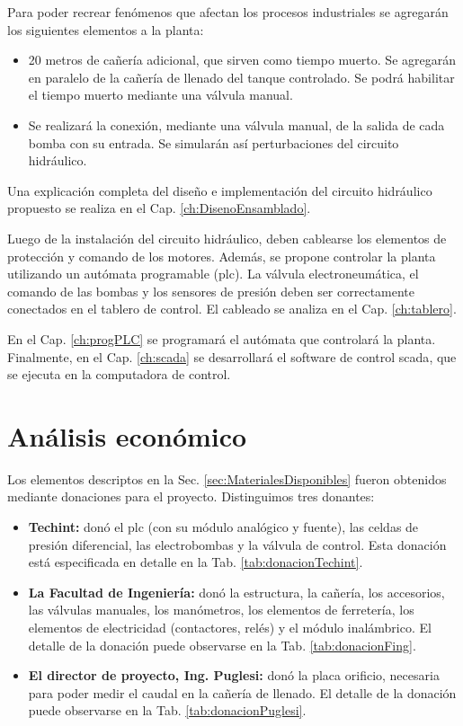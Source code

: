 Para poder recrear fenómenos que afectan los procesos industriales se agregarán
los siguientes elementos a la planta:
\begin{itemize}
\item 20 metros de cañería adicional, que sirven como tiempo
muerto.
Se agregarán en paralelo de la cañería de llenado del tanque controlado.
Se podrá habilitar el tiempo muerto mediante una válvula manual.
\item Se realizará la conexión, mediante una válvula manual, de la salida de
cada bomba con su entrada. Se simularán así perturbaciones
del circuito hidráulico.
\end{itemize}

Una explicación completa del diseño e implementación del circuito hidráulico
propuesto se realiza en el Cap. \ref{ch:DisenoEnsamblado}.

Luego de la instalación del circuito hidráulico, deben cablearse los elementos
de protección y comando de los motores.
Además, se propone controlar la planta utilizando un autómata
programable (\gls{plc}).
La válvula electroneumática, el comando de las bombas y los sensores de presión
deben ser correctamente conectados en el tablero de control.
El cableado se analiza en el Cap. \ref{ch:tablero}.

En el Cap. \ref{ch:progPLC} se programará el autómata que controlará la
planta. Finalmente, en el Cap. \ref{ch:scada} se desarrollará el software
de control \gls{scada}, que se ejecuta en la computadora de control.

\section{Análisis económico}
\label{sec:AnalisisEconomico}
Los elementos descriptos en la Sec. \ref{sec:MaterialesDisponibles} fueron
obtenidos mediante donaciones para el proyecto.
Distinguimos tres donantes:
\begin{itemize}
 \item \textbf{Techint:} donó el \gls{plc} (con su módulo analógico y fuente),
las celdas de presión diferencial, las electrobombas y la válvula de control.
Esta donación está especificada en detalle en la Tab.
\ref{tab:donacionTechint}.
 \item \textbf{La Facultad de Ingeniería:} donó la estructura, la cañería, los
accesorios, las válvulas manuales, los manómetros, los elementos de ferretería,
los elementos de electricidad (contactores, relés) y el módulo inalámbrico.
El detalle de la donación puede observarse en la Tab. \ref{tab:donacionFing}.
\item \textbf{El director de proyecto, Ing. Puglesi:} donó la placa orificio,
necesaria para poder medir el caudal en la cañería de llenado.
El detalle de la donación puede observarse en la Tab.
\ref{tab:donacionPuglesi}.
\end{itemize}

